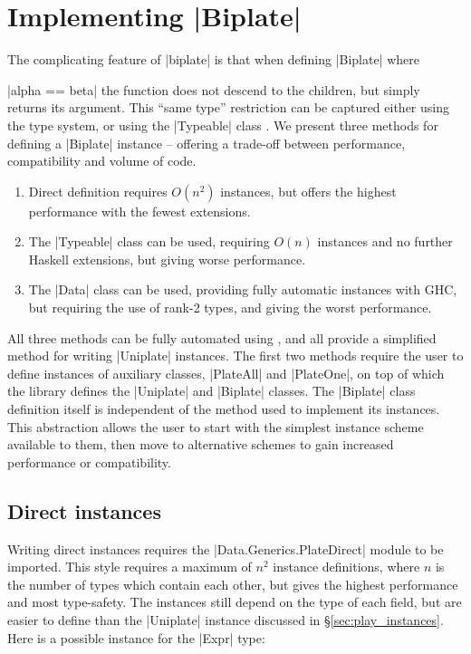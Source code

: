 \section{Implementing |Biplate|}
\label{sec:implement_playex}

The complicating feature of |biplate| is that when defining |Biplate| where \ignore|alpha == beta| the function does not descend to the children, but simply returns its argument. This ``same type'' restriction can be captured either using the type system, or using the |Typeable| class \cite{lammel:syb}. We present three methods for defining a |Biplate| instance -- offering a trade-off between performance, compatibility and volume of code.

\begin{enumerate}
\item Direct definition requires $O(n^2)$ instances, but offers the highest performance with the fewest extensions.
\item The |Typeable| class can be used, requiring $O(n)$ instances and no further Haskell extensions, but giving worse performance.
\item The |Data| class can be used, providing fully automatic instances with GHC, but requiring the use of rank-2 types, and giving the worst performance.
\end{enumerate}

All three methods can be fully automated using \derive{}, and all provide a simplified method for writing |Uniplate| instances. The first two methods require the user to define instances of auxiliary classes, |PlateAll| and |PlateOne|, on top of which the library defines the |Uniplate| and |Biplate| classes. The |Biplate| class definition itself is independent of the method used to implement its instances. This abstraction allows the user to start with the simplest instance scheme available to them, then move to alternative schemes to gain increased performance or compatibility.


\subsection{Direct instances}
\label{sec:implement_playdirect}

Writing direct instances requires the |Data.Generics.PlateDirect| module to be imported. This style requires a maximum of $n^2$ instance definitions, where $n$ is the number of types which contain each other, but gives the highest performance and most type-safety. The instances still depend on the type of each field, but are easier to define than the |Uniplate| instance discussed in \S\ref{sec:play_instances}. Here is a possible instance for the |Expr| type:

